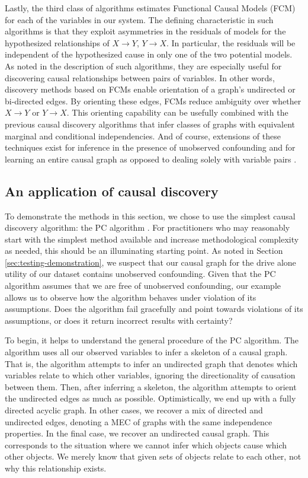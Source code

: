Lastly, the third class of algorithms estimates Functional Causal Models (FCM) \citep{goudet_2018_learning} for each of the variables in our system.
The defining characteristic in such algorithms is that they exploit asymmetries in the residuals of models for the hypothesized relationships of $X \rightarrow Y$, $Y \rightarrow X$.
In particular, the residuals will be independent of the hypothesized cause in only one of the two potential models.
As noted in the description of such algorithms, they are especially useful for discovering causal relationships between pairs of variables.
In other words, discovery methods based on FCMs enable orientation of a graph's undirected or bi-directed edges.
By orienting these edges, FCMs reduce ambiguity over whether $X \rightarrow Y$ or $Y \rightarrow X$.
This orienting capability can be usefully combined with the previous causal discovery algorithms that infer classes of graphs with equivalent marginal and conditional independencies.
And of course, extensions of these techniques exist for inference in the presence of unobserved confounding \citep[Sec. 6]{goudet_2018_learning} and for learning an entire causal graph as opposed to dealing solely with variable pairs \citep{zheng_2020_learning}.

\subsection{An application of causal discovery}
\label{sec:discovery-application}
To demonstrate the methods in this section, we chose to use the simplest causal discovery algorithm: the PC algorithm \citep{glymour_2001_causation}.
For practitioners who may reasonably start with the simplest method available and increase methodological complexity as needed, this should be an illuminating starting point.
As noted in Section \ref{sec:testing-demonstration}, we suspect that our causal graph for the drive alone utility of our dataset contains unobserved confounding.
Given that the PC algorithm assumes that we are free of unobserved confounding, our example allows us to observe how the algorithm behaves under violation of its assumptions.
Does the algorithm fail gracefully and point towards violations of its assumptions, or does it return incorrect results with certainty?

To begin, it helps to understand the general procedure of the PC algorithm. The algorithm uses all our observed variables to infer a skeleton of a causal graph.
That is, the algorithm attempts to infer an undirected graph that denotes which variables relate to which other variables, ignoring the directionality of causation between them.
Then, after inferring a skeleton, the algorithm attempts to orient the undirected edges as much as possible.
Optimistically, we end up with a fully directed acyclic graph.
In other cases, we recover a mix of directed and undirected edges, denoting a MEC of graphs with the same independence properties.
In the final case, we recover an undirected causal graph.
This corresponds to the situation where we cannot infer which objects cause which other objects.
We merely know that given sets of objects relate to each other, not why this relationship exists.


